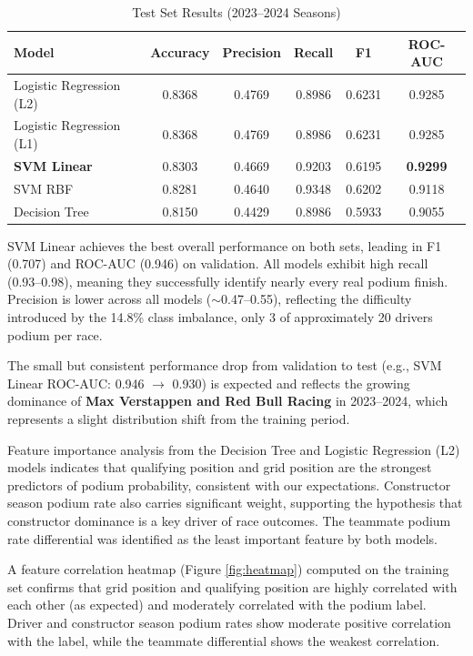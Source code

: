 \documentclass[11pt]{article}
\begin{document}
\begin{table}[h]
\centering
\caption{Test Set Results (2023--2024 Seasons)}
\label{tab:test}
\begin{tabular}{@{}lccccc@{}}
\toprule
\textbf{Model} & \textbf{Accuracy} & \textbf{Precision} & \textbf{Recall} & \textbf{F1} & \textbf{ROC-AUC} \\
\midrule
Logistic Regression (L2) & 0.8368 & 0.4769 & 0.8986 & 0.6231 & 0.9285 \\
Logistic Regression (L1) & 0.8368 & 0.4769 & 0.8986 & 0.6231 & 0.9285 \\
\textbf{SVM Linear}       & 0.8303 & 0.4669 & 0.9203 & 0.6195 & \textbf{0.9299} \\
SVM RBF                  & 0.8281 & 0.4640 & 0.9348 & 0.6202 & 0.9118 \\
Decision Tree            & 0.8150 & 0.4429 & 0.8986 & 0.5933 & 0.9055 \\
\bottomrule
\end{tabular}
\end{table}
 
SVM Linear achieves the best overall performance on both sets, leading in F1 (0.707) and ROC-AUC (0.946) on validation. All models exhibit high recall (0.93--0.98), meaning they successfully identify nearly every real podium finish. Precision is lower across all models ($\sim$0.47--0.55), reflecting the difficulty introduced by the 14.8\% class imbalance, only 3 of approximately 20 drivers podium per race.
 
The small but consistent performance drop from validation to test (e.g., SVM Linear ROC-AUC: 0.946 $\rightarrow$ 0.930) is expected and reflects the growing dominance of \textbf{Max Verstappen and Red Bull Racing} in 2023--2024, which represents a slight distribution shift from the training period.
 
Feature importance analysis from the Decision Tree and Logistic Regression (L2) models indicates that qualifying position and grid position are the strongest predictors of podium probability, consistent with our expectations. Constructor season podium rate also carries significant weight, supporting the hypothesis that constructor dominance is a key driver of race outcomes. The teammate podium rate differential was identified as the least important feature by both models.
 
A feature correlation heatmap (Figure \ref{fig:heatmap}) computed on the training set confirms that grid position and qualifying position are highly correlated with each other (as expected) and moderately correlated with the podium label. Driver and constructor season podium rates show moderate positive correlation with the label, while the teammate differential shows the weakest correlation.
 
\end{document}
